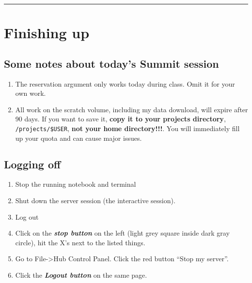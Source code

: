\documentclass[11pt]{article}
\providecommand{\tightlist}{%
      \setlength{\itemsep}{0pt}\setlength{\parskip}{0pt}}
\begin{document}
\begin{center}\rule{0.5\linewidth}{\linethickness}\end{center}

    \hypertarget{finishing-up}{%
\section{Finishing up}\label{finishing-up}}

\hypertarget{some-notes-about-todays-summit-session}{%
\subsection{Some notes about today's Summit
session}\label{some-notes-about-todays-summit-session}}

\begin{enumerate}
\def\labelenumi{\arabic{enumi}.}
\tightlist
\item
  The reservation argument only works today during class. Omit it for
  your own work.
\item
  All work on the scratch volume, including my data download, will
  expire after 90 days. If you want to save it, \textbf{copy it to your
  projects directory}, \texttt{/projects/\$USER}, \textbf{not your home
  directory!!!}. You will immediately fill up your quota and can cause
  major issues.
\end{enumerate}

\hypertarget{logging-off}{%
\subsection{Logging off}\label{logging-off}}

\begin{enumerate}
\def\labelenumi{\arabic{enumi}.}
\item
  Stop the running notebook and terminal
\item
  Shut down the server session (the interactive session).
\item
  Log out
\item
  Click on the \textbf{\emph{stop button}} on the left (light grey
  square inside dark gray circle), hit the X's next to the listed
  things.
\item
  Go to File-\textgreater Hub Control Panel. Click the red button ``Stop
  my server''.
\item
  Click the \textbf{\emph{Logout button}} on the same page.
\end{enumerate}


    
    
    
\end{document}
